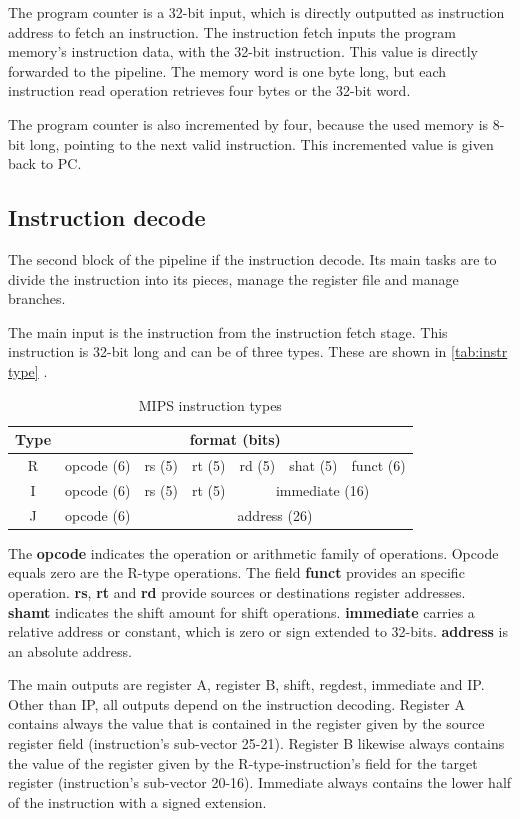 The program counter is a 32-bit input, which is directly outputted as instruction address to fetch an instruction. The instruction fetch inputs the program memory's instruction data, 
with the 32-bit instruction. This value is directly forwarded to the pipeline. The memory word is one byte long, but each instruction read operation retrieves four bytes or the 32-bit
word.

The program counter is also incremented by four, because the used memory is 8-bit long, pointing to the next valid instruction. This incremented value is given back to PC.
\subsection{Instruction decode}
The second block of the pipeline if the instruction decode. Its main tasks are to divide the instruction into its pieces, manage the register file and manage branches.

The main input is the instruction from the instruction fetch stage. This instruction is 32-bit long and can be of three types. These are shown in \autoref{tab:instr type} \cite{mips32}.

\begin{table}[h!]
	\centering
	 \caption{MIPS instruction types}	
	\begin{tabular}{ccccccc}
		\toprule[2pt]
		\textbf{Type} & \multicolumn{6}{c}{\textbf{format (bits) }}   \\
		\toprule[2pt]
		R & opcode (6) & rs (5) & rt (5)   & rd (5) & shat (5) & funct (6) \\
		I & opcode (6) & rs (5) & rt (5)   & \multicolumn{3}{c}{ immediate (16)} \\
		J & opcode (6) & \multicolumn{5}{c}{ address (26)} \\	
		\bottomrule[2pt]
	\end{tabular} 
	\label{tab:instr type}
\end{table}

The \textbf{opcode} indicates the operation or arithmetic family of operations. Opcode equals zero are the R-type operations. The field \textbf{funct} provides an specific operation.
\textbf{rs}, \textbf{rt} and \textbf{rd} provide sources or destinations register addresses. \textbf{shamt} indicates the shift amount for shift operations. \textbf{immediate} carries
a relative address or constant, which is zero or sign extended to 32-bits. \textbf{address} is an absolute address.

The main outputs are register A, register B, shift, regdest, immediate and IP. Other than IP, all outputs depend on the instruction decoding. 
Register A contains always the value that is contained in the register given by the source register field (instruction's sub-vector 25-21). 
Register B likewise always contains the value of the register given by the R-type-instruction's field for the target register (instruction's sub-vector 20-16). 
Immediate always contains the lower half of the instruction with a signed extension. 

